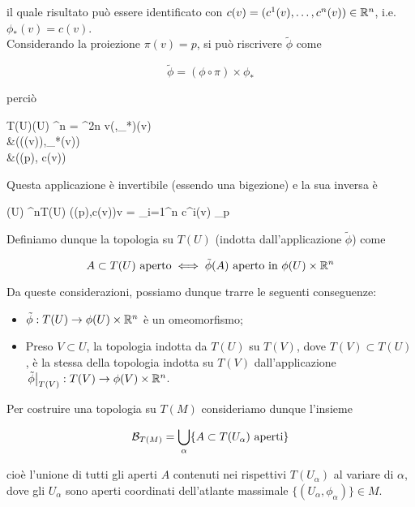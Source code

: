 il quale risultato può essere identificato con $ c(v) = (c^{1}(v),\dots,c^{n}(v)) \in \mathbb{R}^{n} $, i.e. $ \phi_{*}(v) = c(v) $.\\
Considerando la proiezione $ \pi(v) = p $, si può riscrivere $ \tilde{\phi} $ come

\begin{equation}
	\tilde{\phi} = (\phi \circ \pi) \times \phi_{*}
\end{equation}

perciò

\map{\tilde{\phi}}
	{T(U)}{\phi(U) \times \R^{n} = \R^{2n}}
	{v}{(\phi \circ \pi,\phi_{*})(v) \\
		&\mapsto (\phi(\pi(v)),\phi_{*}(v)) \\
		&\mapsto (\phi(p), c(v))
		}

Questa applicazione è invertibile (essendo una bigezione) e la sua inversa è

	{\phi(U) \times \R^{n}}{T(U)}
	{(\phi(p),c(v))}{v = \sum_{i=1}^{n} c^{i}(v) _{p}}

Definiamo dunque la topologia su $ T(U) $ (indotta dall'applicazione $ \tilde{\phi} $) come

\begin{equation}
	A \subset T(U) \text{ aperto} \iff \tilde{\phi}(A) \text{ aperto in } \phi(U) \times \mathbb{R}^{n}
\end{equation}

Da queste considerazioni, possiamo dunque trarre le seguenti conseguenze:

\begin{itemize}
	\item $ \tilde{\phi} : T(U) \to \phi(U) \times \mathbb{R}^{n} $ è un omeomorfismo;
	
	\item Preso $ V \subset U $, la topologia indotta da $ T(U) $ su $ T(V) $, dove $ T(V) \subset T(U) $, è la stessa della topologia indotta su $ T(V) $ dall'applicazione $ \eval{\tilde{\phi}}_{T(V)} : T(V) \to \phi(V) \times \R^{n} $.
\end{itemize}

Per costruire una topologia su $ T(M) $ consideriamo dunque l'insieme

\begin{equation}
	\mathcal{B}_{T(M)} = \bigcup_{\alpha} \{ A \subset T(U_{\alpha}) \text{ aperti} \}
\end{equation}

cioè l'unione di tutti gli aperti $ A $ contenuti nei rispettivi $ T(U_{\alpha}) $ al variare di $ \alpha $, dove gli $ U_{\alpha} $ sono aperti coordinati dell'atlante massimale $ \{ (U_{\alpha},\phi_{\alpha}) \} \in M $.

